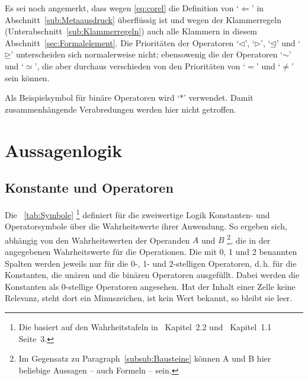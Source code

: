 \documentclass[english,ngerman,parskip=half,headsepline,footsepline,
	fleqn,notitlepage]{scrreprt}
\makeatletter
\newcommand*{\texthead}[1]{\textnormal{\textsf{\textbf{#1}}}}%
\newcommand*{\Lohead}[1]{\lohead{\texthead{#1}}}
\newcommand*{\Cohead}[1]{\cohead{\texthead{#1}}}
\newcommand*{\Pagestyle}{\pagestyle{scrheadings}}
\newcommand*{\beginsection}[1]{%
	\Cohead{#1}%
	\Lohead{\sectionname~\thesection}%
	\Pagestyle%
}
\newcommand*{\metarep}{\Leftarrow}%
\newcommand*{\opbsp}{\ast}
\newcommand*{\relbsp}{\sim}
\newcommand*{\releqbsp}{\simeq}
\newcommand*{\lrelbsp}{\lhd}
\newcommand*{\rrelbsp}{\rhd}
\newcommand*{\lreleqbsp}{\unlhd}
\newcommand*{\rreleqbsp}{\unrhd}
\newcommand*{\charqt}[1]{\enquote*{#1}}%
\newcommand*{\symqt}[1]{\charqt{#1}}%
\newcommand*{\sectionname}{Abschnitt}
\newcommand*{\subsectionname}{Unterabschnitt}
\newcommand*{\subsubsectionname}{Paragraph}
\newcommand*{\textdh}{d.\@\,h.\@ }
\newcommand*{\hidden}[1]{}
\newcommand*{\glsIdx}[1]{\gls{#1}\idx{\gls{#1}}}%
\makeatother
\begin{document}
	Es sei noch angemerkt, dass wegen \vref{eq:corel}
	die Definition von \symqt{$\metarep$} in \sectionname~\vref{sub:Metaausdruck}
	überflüssig ist
	und wegen der Klammerregeln
	(\seename \subsectionname~\vref{sub:Klammerregeln})
	auch alle Klammern in diesem \sectionname~\ref{sec:Formalelement}.
	Die Prioritäten der Operatoren \symqt{$\lrelbsp$}, \symqt{$\rrelbsp$},
	\symqt{$\lreleqbsp$} und \symqt{$\rreleqbsp$}
	unterscheiden sich normalerweise nicht;
	ebensowenig die der Operatoren \symqt{$\relbsp$} und \symqt{$\releqbsp$},
	die aber durchaus verschieden von den Prioritäten
	von \symqt{$=$} und \symqt{$\ne$} sein können.

	Als Beispielsymbol für binäre Operatoren wird \symqt{$\opbsp$} verwendet.
	Damit zusammenhängende Verabredungen werden hier nicht getroffen.

	\section{Aussagenlogik}%
	\beginsection{Aussagenlogik}
	\label{sec:Aussagenlogik}
	\hidden{\glsIdx{Aussagenlogik}}

	\subsection{Konstante und Operatoren}%
	\label{sub:Operatoren}

	Die \tablename~\vref{tab:Symbole}
	\footnote{%
		Die \tablename{} basiert auf den Wahrheitstafeln in~\cite{bib:Junktor}
		Kapitel~2.2 und~\cite{bib:Rautenberg} Kapitel~1.1 Seite~3.%
	}
	definiert für die zweiwertige Logik Konstanten- und Operatorsymbole
	über die Wahrheitswerte ihrer Anwendung.
	So ergeben sich,
	abhängig von den Wahrheitswerten der Operanden $A$ und $B$
	\footnote{%
		Im Gegensatz zu \subsubsectionname~\vref{subsub:Bausteine}
		können A und B hier beliebige Aussagen -- auch Formeln -- sein.%
	},
	die in der \tablename{} angegebenen Wahrheitswerte für die Operationen.
	Die mit 0, 1 und 2 benannten Spalten werden jeweils
	nur für die 0-, 1- und 2-stelligen Operatoren, \textdh
	für die Konstanten, die unären und die binären Operatoren ausgefüllt.
	Dabei werden die Konstanten als 0-stellige Operatoren angesehen.
	Hat der Inhalt einer Zelle keine Relevanz, steht dort ein Minuszeichen,
	ist kein Wert bekannt, so bleibt sie leer.
\end{document}
